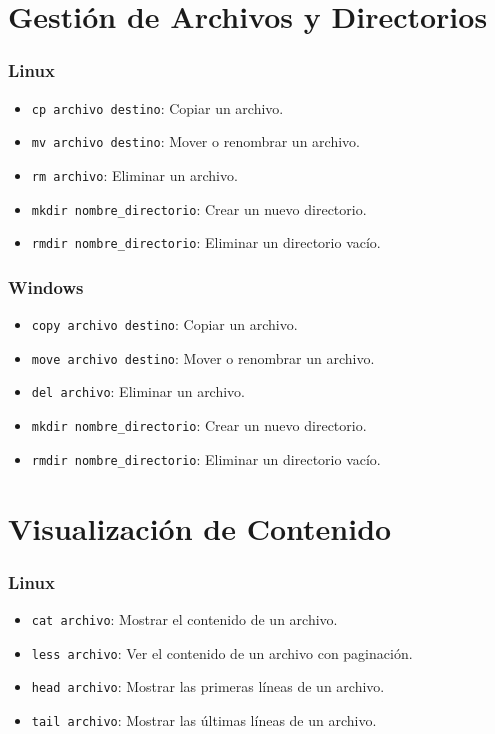 
\section*{Gestión de Archivos y Directorios}

\subsubsection*{Linux}
\begin{itemize}
    \item \texttt{cp archivo destino}: Copiar un archivo.
    \item \texttt{mv archivo destino}: Mover o renombrar un archivo.
    \item \texttt{rm archivo}: Eliminar un archivo.
    \item \texttt{mkdir nombre\_directorio}: Crear un nuevo directorio.
    \item \texttt{rmdir nombre\_directorio}: Eliminar un directorio vacío.
\end{itemize}

\subsubsection*{Windows}
\begin{itemize}
    \item \texttt{copy archivo destino}: Copiar un archivo.
    \item \texttt{move archivo destino}: Mover o renombrar un archivo.
    \item \texttt{del archivo}: Eliminar un archivo.
    \item \texttt{mkdir nombre\_directorio}: Crear un nuevo directorio.
    \item \texttt{rmdir nombre\_directorio}: Eliminar un directorio vacío.
\end{itemize}

\section*{Visualización de Contenido}

\subsubsection*{Linux}
\begin{itemize}
    \item \texttt{cat archivo}: Mostrar el contenido de un archivo.
    \item \texttt{less archivo}: Ver el contenido de un archivo con paginación.
    \item \texttt{head archivo}: Mostrar las primeras líneas de un archivo.
    \item \texttt{tail archivo}: Mostrar las últimas líneas de un archivo.
\end{itemize}

